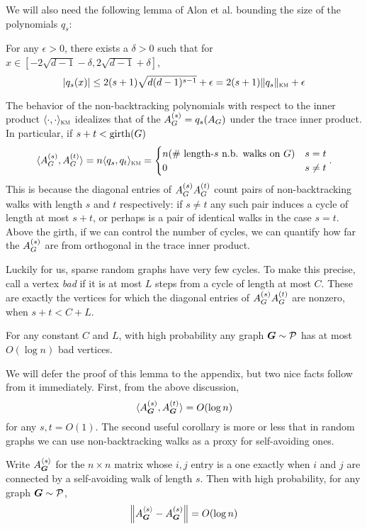 We will also need the following lemma of Alon et al. \cite[Lemma 2.3]{alon2007non} bounding the size of the polynomials $q_s$:
\begin{lemma}   \label{lem:NBW-poly-bound}
    For any $\epsilon>0$, there exists a $\delta>0$ such that for $x\in[-2\sqrt{d-1}-\delta,2\sqrt{d-1}+\delta]$,
    $$
        |q_s(x)| \le 2(s+1)\sqrt{d(d-1)^{s-1}} + \epsilon = 2(s+1)\|q_s\|_{\textsc{km}} + \epsilon
    $$
\end{lemma}

The behavior of the non-backtracking polynomials with respect to the inner product $\langle \cdot,\cdot \rangle_{\textsc{km}}$ idealizes that of the $A^{(s)}_{G} = q_s(A_{G})$ under the trace inner product. In particular, if $s + t < \operatorname{girth}(G)$
$$
    \langle A^{(s)}_{G},A^{(t)}_{G} \rangle = n\langle q_s,q_t \rangle_{\textsc{km}} = \begin{cases} n (\text{\# length-$s$ n.b. walks on $G$}) & s=t \\ 0 & s \neq t \end{cases}.
$$
This is because the diagonal entries of $A^{(s)}_{G}A^{(t)}_{G}$ count pairs of non-backtracking walks with length $s$ and $t$ respectively: if $s\neq t$ any such pair induces a cycle of length at most $s+t$, or perhaps is a pair of identical walks in the case $s=t$. Above the girth, if we can control the number of cycles, we can quantify how far the $A^{(s)}_{G}$ are from orthogonal in the trace inner product.

Luckily for us, sparse random graphs have very few cycles. To make this precise, call a vertex \emph{bad} if it is at most $L$ steps from a cycle of length at most $C$. These are exactly the vertices for which the diagonal entries of $A^{(s)}_{G}A^{(t)}_{G}$ are nonzero, when $s+t < C+L$.

\begin{lemma}
    For any constant $C$ and $L$, with high probability any graph $\boldsymbol{G} \sim \mathcal{P}$ has at most $O(\log n)$ bad vertices.
\end{lemma}

We will defer the proof of this lemma to the appendix, but two nice facts follow from it immediately. First, from the above discussion,
$$
    \langle A^{(s)}_{\boldsymbol{G}},A^{(t)}_{\boldsymbol{G}} \rangle = O(\log n)
$$
for any $s,t=O(1)$. The second useful corollary is more or less that in random graphs we can use non-backtracking walks as a proxy for self-avoiding ones.

\begin{lemma}
    Write $A^{\langle s \rangle}_{\boldsymbol{G}}$ for the $n\times n$ matrix whose $i,j$ entry is a one exactly when $i$ and $j$ are connected by a self-avoiding walk of length $s$. Then with high probability, for any graph $\boldsymbol{G} \sim \mathcal{P}$,
    \begin{equation}
        \left\| A^{\langle s \rangle}_{\boldsymbol{G}} - A^{(s)}_{\boldsymbol{G}} \right\| = O(\log n)
    \end{equation}
\end{lemma}

